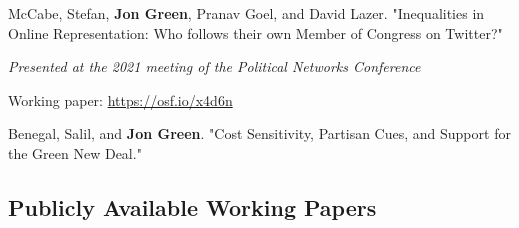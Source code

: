 \documentclass[letterpaper]{article}
\renewenvironment{itemize}{
  \begin{list}{}{
    \setlength{\leftmargin}{1.5em}
  }
}{
  \end{list}
}
\begin{document}
\begin{itemize}
\item McCabe, Stefan, \textbf{Jon Green}, Pranav Goel, and David Lazer. "Inequalities in Online Representation: Who follows their own Member of Congress on Twitter?"
\begin{itemize}
\item \textit{Presented at the 2021 meeting of the Political Networks Conference}
\item Working paper: \url{https://osf.io/x4d6n}
\end{itemize} 

\item Benegal, Salil, and \textbf{Jon Green}. "Cost Sensitivity, Partisan Cues, and Support for the Green New Deal." %

\end{itemize}

\subsection*{Publicly Available Working Papers}
\end{document}
